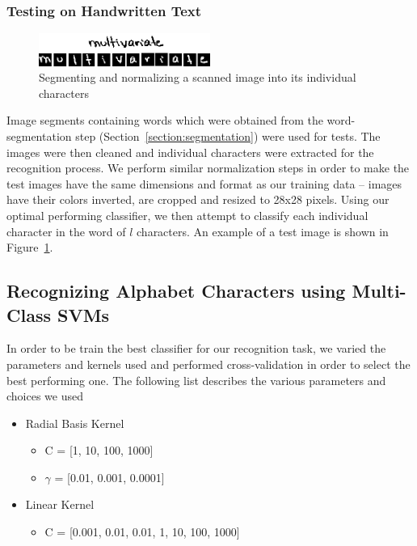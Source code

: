 \documentclass[12pt]{article}
\begin{document}
	\subsubsection{Testing on Handwritten Text}
	\label{subsubsection:experiments:testing}	
	
		\begin{figure}[htbp!]
		\centering
		\includegraphics[width=0.5\textwidth]{multivariate_test.eps}
		\caption{Segmenting and normalizing a scanned image into its individual characters}
		\label{figure:multivariate_test}
		\end{figure}
		
		Image segments containing words which were obtained from the word-segmentation step (Section~\ref{section:segmentation}) were used for tests. The images were then cleaned and individual characters were extracted for the recognition process. We perform similar normalization steps in order to make the test images have the same dimensions and format as our training data -- images have their colors inverted, are cropped and resized to 28x28 pixels. Using our optimal performing classifier, we then attempt to classify each individual character in the word of $l$ characters. An example of a test image is shown in Figure~\ref{figure:multivariate_test}.
	
	\subsection{Recognizing Alphabet Characters using Multi-Class SVMs}
	\label{subsection:experiments:svm}
	
		In order to be train the best classifier for our recognition task, we varied the parameters and kernels used and performed cross-validation in order to select the best performing one. The following list describes the various parameters and choices we used

		\begin{itemize}
			\item Radial Basis Kernel
			\begin{itemize}
				\item C = [1, 10, 100, 1000]
				\item $\gamma$ = [0.01, 0.001, 0.0001]
			\end{itemize}
			\item Linear Kernel
			\begin{itemize}
				\item C = [0.001, 0.01, 0.01, 1, 10, 100, 1000]
			\end{itemize}
		\end{itemize}
		
\end{document}
